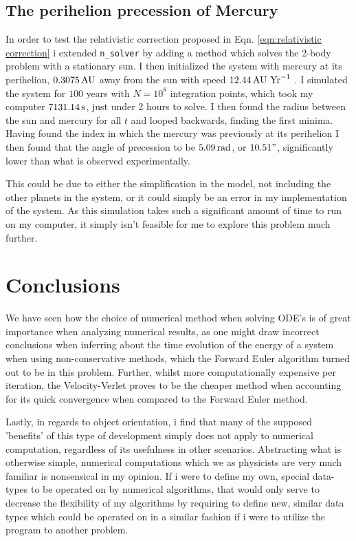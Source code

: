 \documentclass[10pt,showpacs,preprintnumbers,amsmath,amssymb,nofootinbib,aps,prl,twocolumn,groupedaddress,superscriptaddress,showkeys]{revtex4-1}
\begin{document}
\subsection{The perihelion precession of Mercury}
  In order to test the relativistic correction proposed in Eqn. \ref{eqn:relativistic correction} i extended \lstinline{n_solver} by adding a method which solves the 2-body problem with a stationary sun. I then initialized the system with mercury at its perihelion, $0.3075\,\textup{AU}$ away from the sun with speed $12.44\, \textup{AU Yr}^{-1}$ \cite{problem_set}. I simulated the system for $100$ years with $N=10^8$ integration points, which took my computer $7131.14\,\textup s$, just under 2 hours to solve. I then found the radius between the sun and mercury for all $t$ and looped backwards, finding the first minima. Having found the index in which the mercury was previously at its perihelion I then found that the angle of precession to be $5.09\,\textup{rad}$, or $10.51"$, significantly lower than what is observed experimentally.

  This could be due to either the simplification in the model, not including the other planets in the system, or it could simply be an error in my implementation of the system. As this simulation takes such a significant amount of time to run on my computer, it simply isn't feasible for me to explore this problem much further.


\section{Conclusions}
  We have seen how the choice of numerical method when solving ODE's is of great importance when analyzing numerical results, as one might draw incorrect conclusions when inferring about the time evolution of the energy of a system when using non-conservative methods, which the Forward Euler algorithm turned out to be in this problem. Further, whilst more computationally expensive per iteration, the Velocity-Verlet proves to be the cheaper method when accounting for its quick convergence when compared to the Forward Euler method.

  Lastly, in regards to object orientation, i find that many of the supposed 'benefits' of this type of development simply does not apply to numerical computation, regardless of its usefulness in other scenarios. Abstracting what is otherwise simple, numerical computations which we as physicists are very much familiar is nonsensical in my opinion. If i were to define my own, special data-types to be operated on by numerical algorithms, that would only serve to decrease the flexibility of my algorithms by requiring to define new, similar data types which could be operated on in a similar fashion if i were to utilize the program to another problem.
\end{document}
